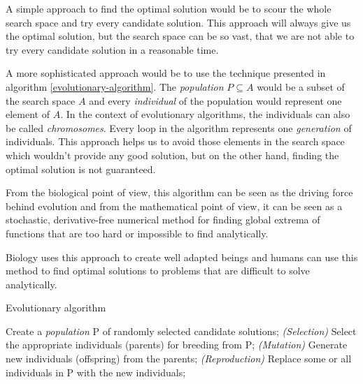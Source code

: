 A simple approach to find the optimal solution would be to scour the whole search space and try every candidate solution. This approach will always give us the optimal solution, but the search space can be so vast, that we are not able to try every candidate solution in a reasonable time.

A more sophisticated approach would be to use the technique presented in algorithm \ref{evolutionary-algorithm}. The \textit{population} $P \subseteq A$ would be a subset of the search space $A$ and every \textit{individual} of the population would represent one element of $A$. In the context of evolutionary algorithms, the individuals can also be called \textit{chromosomes}. Every loop in the algorithm represents one \textit{generation} of individuals. This approach helps us to avoid those elements in the search space which wouldn't provide any good solution, but on the other hand, finding the optimal solution is not guaranteed.

From the biological point of view, this algorithm can be seen as the driving force behind evolution and from the mathematical point of view, it can be seen as a stochastic, derivative-free numerical method for finding global extrema of functions that are too hard or impossible to find analytically.

Biology uses this approach to create well adapted beings and humans can use this method to find optimal solutions to problems that are difficult to solve analytically.

\begin{algorithm}
	\caption{Evolutionary algorithm \cite{natural-computing-algorithms}}
	\label{evolutionary-algorithm}
	\begin{algorithmic}[1]
		\State Create a \textit{population} P of randomly selected candidate solutions;
		\Repeat
		    \State \textit{(Selection)} Select the appropriate individuals (parents) for breeding from P;
		    \State \textit{(Mutation)} Generate new individuals (offspring) from the parents;
		    \State \textit{(Reproduction)} Replace some or all individuals in P with the new individuals;
	\end{algorithmic}
\end{algorithm}


